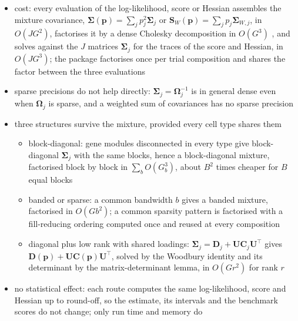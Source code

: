 \begin{itemize}
  \item cost: every evaluation of the log-likelihood, score or Hessian assembles the mixture covariance,
        \(\boldsymbol{\Sigma}(\boldsymbol{p})=\sum_{j}p_{j}^{2}\boldsymbol{\Sigma}_{j}\) or \(\boldsymbol{S}_{W}(\boldsymbol{p})=\sum_{j}p_{j}\boldsymbol{\Sigma}_{W,j}\), in
        \(O(JG^{2})\), factorises it by a dense Cholesky decomposition in \(O(G^{3})\) \cite{golubMatrixComputations2013}, and
        solves against the \(J\) matrices \(\boldsymbol{\Sigma}_{j}\) for the traces of the score and Hessian, in \(O(JG^{3})\); the
        package factorises once per trial composition and shares the factor between the three evaluations
  \item sparse precisions do not help directly: \(\boldsymbol{\Sigma}_{j}=\boldsymbol{\Omega}_{j}^{-1}\) is in general dense even when
        \(\boldsymbol{\Omega}_{j}\) is sparse, and a weighted sum of covariances has no sparse precision
  \item three structures survive the mixture, provided every cell type shares them
  \begin{itemize}
    \item block-diagonal: gene modules disconnected in every type give block-diagonal \(\boldsymbol{\Sigma}_{j}\) with the same
          blocks, hence a block-diagonal mixture, factorised block by block in \(\sum_{b}O(G_{b}^{3})\), about \(B^{2}\) times
          cheaper for \(B\) equal blocks
    \item banded or sparse: a common bandwidth \(b\) gives a banded mixture, factorised in \(O(Gb^{2})\); a common sparsity
          pattern is factorised with a fill-reducing ordering computed once and reused at every composition
          \cite{chenAlgorithm887CHOLMOD2008}
    \item diagonal plus low rank with shared loadings: \(\boldsymbol{\Sigma}_{j}=\boldsymbol{D}_{j}+\boldsymbol{U}\boldsymbol{C}_{j}\boldsymbol{U}^{\top}\) gives
          \(\boldsymbol{D}(\boldsymbol{p})+\boldsymbol{U}\boldsymbol{C}(\boldsymbol{p})\boldsymbol{U}^{\top}\), solved by the Woodbury identity and its determinant by the
          matrix-determinant lemma, in \(O(Gr^{2})\) for rank \(r\) \cite{hagerUpdatingInverseMatrix1989}
  \end{itemize}
  \item no statistical effect: each route computes the same log-likelihood, score and Hessian up to round-off, so the
        estimate, its intervals and the benchmark scores do not change; only run time and memory do

\end{itemize}
